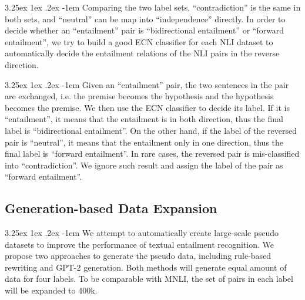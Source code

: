 \documentclass[12pt]{article}
\makeatletter
\renewcommand\paragraph{\@startsection{paragraph}{5}{\z@}%
  {3.25ex \@plus1ex \@minus.2ex}%
  {-1em}%
  {\normalfont\normalsize\bfseries}}
\makeatother
\begin{document}
\begin{CJK*}{UTF8}{bkai}
\begin{spacing}{1.77}
\paragraph{}
Comparing the two label sets, ``contradiction'' is the same in both sets, and ``neutral'' can be map into ``independence'' directly. In order to decide whether an ``entailment'' pair is ``bidirectional entailment'' or ``forward entailment'', we try to build a good ECN classifier for each NLI dataset to automatically decide the entailment relations of the NLI pairs in the reverse direction.

\paragraph{}
Given an ``entailment'' pair, the two sentences in the pair are exchanged, i.e. the premise becomes the hypothesis and the hypothesis becomes the premise. We then use the ECN classifier to decide its label. If it is ``entailment'', it means that the entailment is in both direction, thus the final label is ``bidirectional entailment''. On the other hand, if the label of the reversed pair is ``neutral'', it means that the entailment only in one direction, thus the final label is ``forward entailment''. In rare cases, the reversed pair is mis-classified into ``contradiction''. We ignore such result and assign the label of the pair as ``forward entailment''.

\subsection{Generation-based Data Expansion}
\label{section:pseudo_dataset}
\paragraph{}
We attempt to automatically create large-scale pseudo datasets to improve the performance of textual entailment recognition. We propose two approaches to generate the pseudo data, including rule-based rewriting and GPT-2 generation. Both methods will generate equal amount of data for four labels. To be comparable with MNLI, the set of pairs in each label will be expanded to 400k.


\end{spacing}
\end{CJK*}
\end{document}
